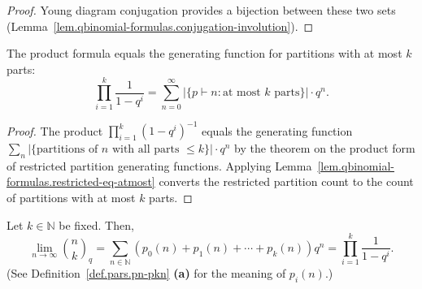 \begin{proof}
\leanok
Young diagram conjugation provides a bijection between these two sets
(Lemma~\ref{lem.qbinomial-formulas.conjugation-involution}).
\end{proof}

\begin{theorem}
\label{thm.qbinomial-formulas.limit-eq-partition-gf}
\leanhelper
\leanok
The product formula equals the generating function for partitions with at most $k$ parts:
\[
\prod_{i=1}^{k} \frac{1}{1-q^i}
= \sum_{n=0}^{\infty} |\{p \vdash n : \text{at most } k \text{ parts}\}| \cdot q^n.
\]
\end{theorem}

\begin{proof}
\leanok
The product $\prod_{i=1}^{k}(1-q^i)^{-1}$ equals the generating function
$\sum_n |\{\text{partitions of } n \text{ with all parts } \le k\}| \cdot q^n$
by the theorem on the product form of restricted partition generating functions.
Applying Lemma~\ref{lem.qbinomial-formulas.restricted-eq-atmost} converts the restricted
partition count to the count of partitions with at most $k$ parts.
\end{proof}

\begin{proposition}
\label{prop.pars.qbinom.lim1}
\leantarget
\leanok
Let $k\in\mathbb{N}$ be fixed. Then,
\[
\lim_{n\rightarrow\infty}\binom{n}{k}_{q}=\sum_{n\in\mathbb{N}}\left(
p_{0}\left(  n\right)  +p_{1}\left(  n\right)  +\cdots+p_{k}\left(  n\right)
\right)  q^{n}=\prod_{i=1}^{k}\frac{1}{1-q^{i}}.
\]
(See Definition~\ref{def.pars.pn-pkn} \textbf{(a)} for the meaning of
$p_{i}\left(  n\right)  $.)
\end{proposition}

